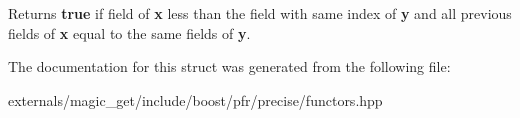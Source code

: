 \begin{DoxyReturn}{Returns}
{\bfseries true} if field of {\bfseries x} less than the field with same index of {\bfseries y} and all previous fields of {\bfseries x} equal to the same fields of {\bfseries y}.
\end{DoxyReturn}


The documentation for this struct was generated from the following file\+:\begin{DoxyCompactItemize}
\item 
externals/magic\+\_\+get/include/boost/pfr/precise/functors.\+hpp\end{DoxyCompactItemize}
